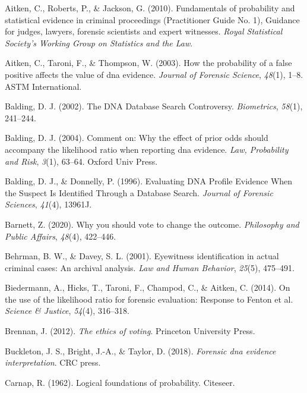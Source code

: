 \documentclass[10pt,dvipsnames,enabledeprecatedfontcommands]{scrartcl}
\begin{document}
\hypertarget{ref-aitken2010fundamentals}{}
Aitken, C., Roberts, P., \& Jackson, G. (2010). Fundamentals of
probability and statistical evidence in criminal proceedings
(Practitioner Guide No. 1), Guidance for judges, lawyers, forensic
scientists and expert witnesses. \emph{Royal Statistical Society's
Working Group on Statistics and the Law}.

\hypertarget{ref-aitken2003probability}{}
Aitken, C., Taroni, F., \& Thompson, W. (2003). How the probability of a
false positive affects the value of dna evidence. \emph{Journal of
Forensic Science}, \emph{48}(1), 1--8. ASTM International.

\hypertarget{ref-balding2002DNDatabaseSearch}{}
Balding, D. J. (2002). The DNA Database Search Controversy.
\emph{Biometrics}, \emph{58}(1), 241--244.

\hypertarget{ref-balding2004comment}{}
Balding, D. J. (2004). Comment on: Why the effect of prior odds should
accompany the likelihood ratio when reporting dna evidence. \emph{Law,
Probability and Risk}, \emph{3}(1), 63--64. Oxford Univ Press.

\hypertarget{ref-balding1996EvaluatingDNAProfilea}{}
Balding, D. J., \& Donnelly, P. (1996). Evaluating DNA Profile Evidence
When the Suspect Is Identified Through a Database Search. \emph{Journal
of Forensic Sciences}, \emph{41}(4), 13961J.

\hypertarget{ref-Barnett2020Why}{}
Barnett, Z. (2020). Why you should vote to change the outcome.
\emph{Philosophy and Public Affairs}, \emph{48}(4), 422--446.

\hypertarget{ref-behrman2001EyewitnessIdentificationActual}{}
Behrman, B. W., \& Davey, S. L. (2001). Eyewitness identification in
actual criminal cases: An archival analysis. \emph{Law and Human
Behavior}, \emph{25}(5), 475--491.

\hypertarget{ref-biedermann2014UseLikelihoodRatio}{}
Biedermann, A., Hicks, T., Taroni, F., Champod, C., \& Aitken, C.
(2014). On the use of the likelihood ratio for forensic evaluation:
Response to Fenton et al. \emph{Science \& Justice}, \emph{54}(4),
316--318.

\hypertarget{ref-brennan2012ethics}{}
Brennan, J. (2012). \emph{The ethics of voting}. Princeton University
Press.

\hypertarget{ref-buckleton2018forensic}{}
Buckleton, J. S., Bright, J.-A., \& Taylor, D. (2018). \emph{Forensic
dna evidence interpretation}. CRC press.

\hypertarget{ref-carnap1962logical}{}
Carnap, R. (1962). Logical foundations of probability. Citeseer.
\end{document}
